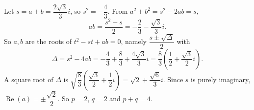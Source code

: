 Let $s=a+b=\dfrac{2\sqrt3}{3}i$, so $s^2=-\dfrac43$. From $a^2+b^2=s^2-2ab=s$,
\[ab=\dfrac{s^2-s}{2}=-\dfrac23-\dfrac{\sqrt3}{3}i.\]
So $a,b$ are the roots of $t^2-st+ab=0$, namely $\dfrac{s\pm\sqrt\Delta}{2}$ with
\[\Delta=s^2-4ab=-\dfrac43+\dfrac83+\dfrac{4\sqrt3}{3}i=\dfrac83\left(\dfrac12+\dfrac{\sqrt3}{2}i\right).\]
A square root of $\Delta$ is $\sqrt{\dfrac83}\left(\dfrac{\sqrt3}2+\dfrac12i\right)=\sqrt2+\dfrac{\sqrt6}{3}i$. Since $s$ is purely imaginary, $\operatorname{Re}(a)=\pm\dfrac{\sqrt2}{2}$. So $p=2$, $q=2$ and $p+q=\boxed{4}$.
